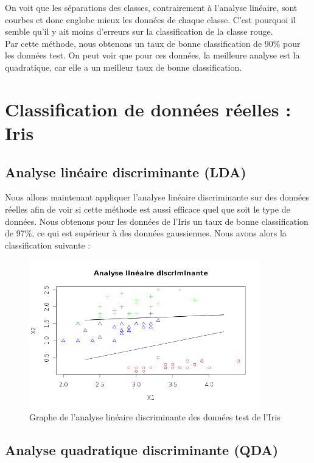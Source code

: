 \documentclass[a4paper,11pt]{article}
\begin{document}
  On voit que les séparations des classes, contrairement à l'analyse linéaire, sont courbes
  et donc englobe mieux les données de chaque classe. C'est pourquoi il semble qu'il y ait moins
  d'erreurs sur la classification de la classe rouge.\\
  
  Par cette méthode, nous obtenons un taux de bonne classification de 90\% pour les données test.
  On peut voir que pour ces données, la meilleure analyse est la quadratique, car elle a un meilleur
  taux de bonne classification.
  
  \section{Classification de données réelles : Iris}
  
  \subsection{Analyse linéaire discriminante (LDA)}
  
  Nous allons maintenant appliquer l'analyse linéaire discriminante sur des données réelles afin
  de voir si cette méthode est aussi efficace quel que soit le type de données. Nous obtenons pour les 
  données de l'Iris un taux de bonne classification de 97\%, ce qui est supérieur à des données 
  gaussiennes. Nous avons alors la classification suivante :\\
  
  \newpage
  \begin{figure}[h]
   \center
   \includegraphics[width=10cm]{iris_lineaire.png}
   \caption{Graphe de l'analyse linéaire discriminante des données test de l'Iris}
  \end{figure}
  
  \subsection{Analyse quadratique discriminante (QDA)}
  
\end{document}
